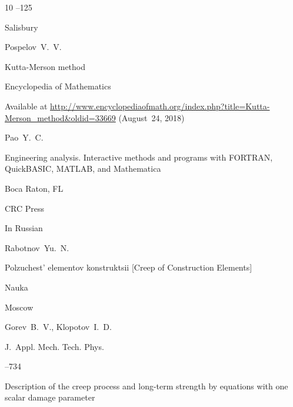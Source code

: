 \begin{thebibliography}{10}
–125

\publaddr Salisbury

\moreref

\by \linebreak Pospelov~V.~V.

\preprint Kutta-Merson method

\preprintinfo Encyclopedia of Mathematics


\elink Available at \url{http://www.encyclopediaofmath.org/index.php?title=Kutta-Merson_method&oldid=33669} (August~24, 2018)








\by Pao~Y.~C.

\book Engineering analysis. Interactive methods and programs with FORTRAN, QuickBASIC, MATLAB, and Mathematica


\publaddr Boca Raton, FL

\publ CRC Press








\lang In Russian

\by Rabotnov~Yu.~N.

\book Polzuchest' elementov konstruktsii \rm [Creep of Construction Elements]


\publ Nauka

\publaddr Moscow







\by Gorev~B.~V., Klopotov~I.~D.

\jour J.~Appl. Mech. Tech. Phys.





–734 

\paper Description of the creep process and long-term strength by equations with one scalar damage parameter






\end{thebibliography}
